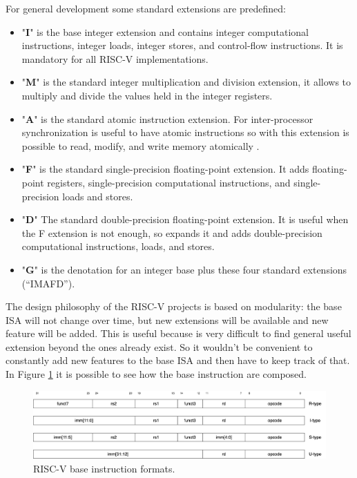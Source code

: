 For general development some standard extensions are predefined:
\begin{itemize}
    \item "\textbf{I}" is the base integer extension and contains integer computational instructions, integer loads, integer stores, and control-ﬂow instructions. It is mandatory for all RISC-V implementations.
    
    \item "\textbf{M}" is the standard integer multiplication and division extension, it allows to multiply and divide the values held in the integer registers.
    
    \item "\textbf{A}" is the standard atomic instruction extension. For inter-processor synchronization is useful to have atomic instructions so with this extension is possible to read, modify, and write memory atomically . 
    
    \item "\textbf{F}" is the standard single-precision ﬂoating-point extension. It adds ﬂoating-point registers, single-precision computational instructions, and single-precision loads and stores. 
    
    \item "\textbf{D}" The standard double-precision ﬂoating-point extension. It is useful when the F extension is not enough, so expands it and adds double-precision computational instructions, loads, and stores.
    
    \item "\textbf{G}" is the denotation for an integer base plus these four standard extensions (“IMAFD”).
\end{itemize}


The design philosophy of the RISC-V projects is based on modularity: the base ISA will not change over time, but new extensions will be available and new feature will be added. This is useful because is very difficult to find general useful extension beyond the ones already exist. So it wouldn't be convenient to constantly add new features to the base ISA and then have to keep track of that.\\
In Figure \ref{riscv-base-instruction-formats} it is possible to see how the base instruction are composed.

\begin{figure}[H]
    \centering
    \includegraphics[scale = 0.27]{Chapter_1/img/riscv-base-instruction-formats.png}
    \caption{RISC-V base instruction formats. \cite{RISC-V-Instruction-Set-Manual}}
    \label{riscv-base-instruction-formats}
\end{figure}

